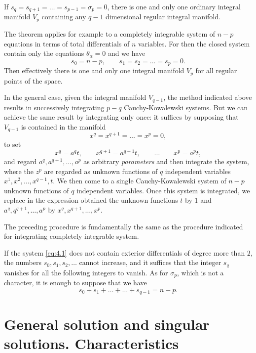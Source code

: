 \begin{thm*}
  If $s_{q}=s_{q+1}=\dots=s_{p-1}=\sigma_{p}=0$, there is one and only one ordinary integral manifold $V_{p}$ containing any $q-1$ dimensional regular integral manifold.
\end{thm*}
The theorem applies for example to a completely integrable system of $n-p$ equations in terms of total differentials of $n$ variables. For then the closed system contain only the equations $\theta_{\alpha}=0$ and we have
\[
s_{0}=n-p,\qquad s_{1}=s_{2}=\dots=s_{p}=0.
\]
Then effectively there is one and only one integral manifold $V_{p}$ for all regular points of the space.

In the general case, given the integral manifold $V_{q-1}$, the method indicated above results in successively integrating $p-q$ Cauchy-Kowalewski systems. But we can achieve the same result by integrating only once: it suffices by supposing that $V_{q-1}$ is contained in the manifold 
\[
x^{q}=x^{q+1}=\dots=x^{p}=0,
\]
to set
\[
x^{q}=a^{q}t,\qquad x^{q+1}=a^{q+1}t,\qquad\dots\qquad x^{p}=a^{p}t,
\]
and regard $a^{q},a^{q+1},\dots,a^{p}$ as arbitrary \emph{parameters} and then integrate the system, where the $z^{p}$ are regarded as unknown functions of $q$ independent variables $x^{1},x^{2},\dots,x^{q-1},t$. We then come to a single Cauchy-Kowalewski system of $n-p$ unknown functions of $q$ independent variables. Once this system is integrated, we replace in the expression obtained the unknown functions $t$ by $1$ and $a^{q},q^{q+1},\dots,a^{p}$ by $x^{q},x^{q+1},\dots,x^{p}$.

The preceding procedure is fundamentally the same as the procedure indicated for integrating completely integrable system.

\begin{rmk*}
  If the system \eqref{eq:4.1} does not contain exterior differentials of degree more than $2$, the numbers $s_{0},s_{1},s_{2},\dots$ cannot increase, and it suffices that the integer $s_{q}$ vanishes for all the following integers to vanish. As for $\sigma_{p}$, which is not a character, it is enough to suppose that we have
\[
s_{0}+s_{1}+\dots+\dots+s_{q-1}=n-p.
\]
\end{rmk*}


\section{General solution and singular solutions. Characteristics}
\label{sec:gener-solut-sing}


